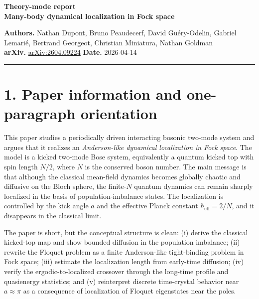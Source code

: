 \documentclass[11pt]{article}
\begin{document}
{\Large \textbf{Theory-mode report}}\\
{\large \textbf{Many-body dynamical localization in Fock space}}

\textbf{Authors.} Nathan Dupont, Bruno Peaudecerf, David Guéry-Odelin, Gabriel Lemarié, Bertrand Georgeot, Christian Miniatura, Nathan Goldman \\
\textbf{arXiv.} \href{https://arxiv.org/abs/2604.09224}{arXiv:2604.09224} \hfill \textbf{Date.} 2026-04-14

\hrule

\section*{1. Paper information and one-paragraph orientation}
This paper studies a periodically driven interacting bosonic two-mode system and argues that it realizes an \emph{Anderson-like dynamical localization in Fock space}. The model is a kicked two-mode Bose system, equivalently a quantum kicked top with spin length $N/2$, where $N$ is the conserved boson number. The main message is that although the classical mean-field dynamics becomes globally chaotic and diffusive on the Bloch sphere, the finite-$N$ quantum dynamics can remain sharply localized in the basis of population-imbalance states. The localization is controlled by the kick angle $a$ and the effective Planck constant $\hbar_\mathrm{eff}=2/N$, and it disappears in the classical limit.

The paper is short, but the conceptual structure is clean: (i) derive the classical kicked-top map and show bounded diffusion in the population imbalance; (ii) rewrite the Floquet problem as a finite Anderson-like tight-binding problem in Fock space; (iii) estimate the localization length from early-time diffusion; (iv) verify the ergodic-to-localized crossover through the long-time profile and quasienergy statistics; and (v) reinterpret discrete time-crystal behavior near $a\approx \pi$ as a consequence of localization of Floquet eigenstates near the poles.
\end{document}
